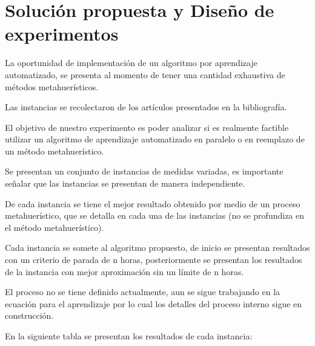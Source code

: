 \documentclass[letterpaper, 10 pt]{article}
\begin{document}
\section*{Solución propuesta y Diseño de experimentos}
La oportunidad de implementación de un algoritmo por aprendizaje automatizado, se presenta al momento de tener una cantidad exhaustiva de métodos metahuerísticos.

Las instancias se recolectaron de los artículos presentados en la bibliografía.

El objetivo de nuestro experimento es poder analizar si es realmente factible utilizar un algoritmo de aprendizaje automatizado en paralelo o en reemplazo de un método metahuerístico.

Se presentan un conjunto de instancias de medidas variadas, es importante señalar que las instancias se presentan de manera independiente.

De cada instancia se tiene el mejor resultado obtenido por medio de un proceso metahuerístico, que se detalla en cada una de las instancias (no se profundiza en el método metahuerístico).

Cada instancia se somete al algoritmo propuesto, de inicio se presentan resultados con un criterio de parada de n horas, posteriormente se presentan los resultados de la instancia con mejor aproximación sin un límite de n horas. 

El proceso no se tiene definido actualmente, aun se sigue trabajando en la ecuación para el aprendizaje por lo cual los detalles del proceso interno sigue en construcción.

En la siguiente tabla se presentan los resultados de cada instancia:
\end{document}
